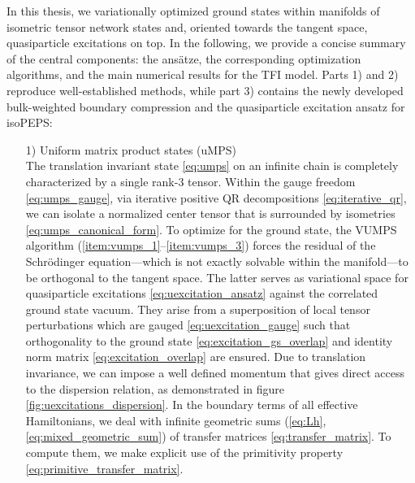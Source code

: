 In this thesis, we variationally optimized ground states within manifolds of isometric tensor network states and, oriented towards the tangent space, quasiparticle excitations on top. In the following, we provide a concise summary of the central components: the ansätze, the corresponding optimization algorithms, and the main numerical results for the TFI model. Parts 1) and 2) reproduce well-established methods, while part 3) contains the newly developed bulk-weighted boundary compression and the quasiparticle excitation ansatz for isoPEPS:
\begin{enumerate}
	\item[1)] Uniform matrix product states (uMPS) \\[0.3em]
	The translation invariant state \eqref{eq:umps} on an infinite chain is completely characterized by a single rank-3 tensor. Within the gauge freedom \eqref{eq:umps_gauge}, via iterative positive QR decompositions \eqref{eq:iterative_qr}, we can isolate a normalized center tensor that is surrounded by isometries \eqref{eq:umps_canonical_form}. To optimize for the ground state, the VUMPS algorithm (\ref{item:vumps_1}--\ref{item:vumps_3}) forces the residual of the Schrödinger equation---which is not exactly solvable within the manifold---to be orthogonal to the tangent space. The latter serves as variational space for quasiparticle excitations \eqref{eq:uexcitation_ansatz} against the correlated ground state vacuum. They arise from a superposition of local tensor perturbations which are gauged \eqref{eq:uexcitation_gauge} such that orthogonality to the ground state \eqref{eq:excitation_gs_overlap} and identity norm matrix \eqref{eq:excitation_overlap} are ensured. Due to translation invariance, we can impose a well defined momentum that gives direct access to the dispersion relation, as demonstrated in figure \ref{fig:uexcitations_dispersion}. In the boundary terms of all effective Hamiltonians, we deal with infinite geometric sums (\ref{eq:Lh}, \ref{eq:mixed_geometric_sum}) of transfer matrices \eqref{eq:transfer_matrix}. To compute them, we make explicit use of the primitivity property \eqref{eq:primitive_transfer_matrix}.
	

\end{enumerate}
